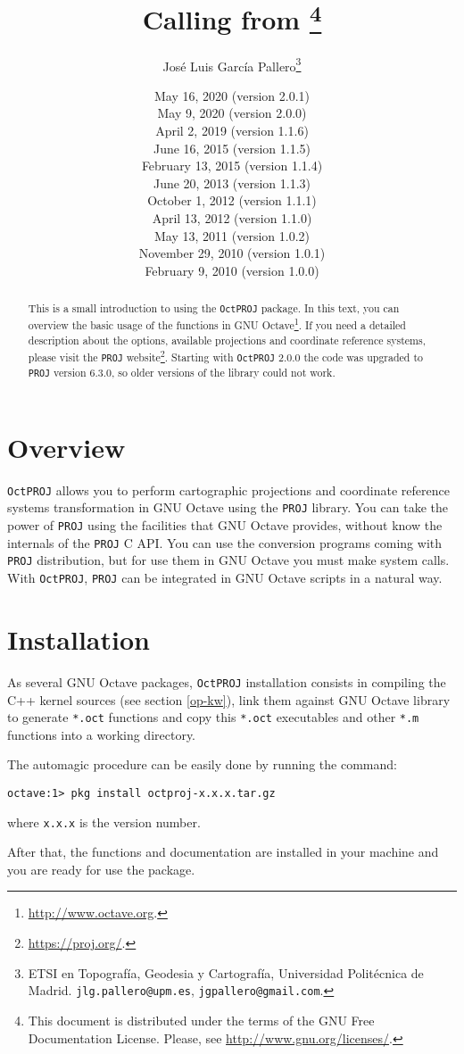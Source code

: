 \documentclass[10pt,a4paper]{article}
\title{\octproj\\Calling \proj{} from \octave\footnote{This document is
       distributed under the terms of the GNU Free Documentation License.
       Please, see \url{http://www.gnu.org/licenses/}.}}
\author{Jos\'e Luis Garc\'ia Pallero\footnote{ETSI en Topograf\'ia, Geodesia y
        Cartograf\'ia, Universidad Polit\'ecnica de Madrid.
        \texttt{jlg.pallero@upm.es}, \texttt{jgpallero@gmail.com}.}}
\date{May 16, 2020 (version 2.0.1)\\
      May 9, 2020 (version 2.0.0)\\
      April 2, 2019 (version 1.1.6)\\
      June 16, 2015 (version 1.1.5)\\
      February 13, 2015 (version 1.1.4)\\
      June 20, 2013 (version 1.1.3)\\
      October 1, 2012 (version 1.1.1)\\
      April 13, 2012 (version 1.1.0)\\
      May 13, 2011 (version 1.0.2)\\
      November 29, 2010 (version 1.0.1)\\
      February 9, 2010 (version 1.0.0)}
\newcommand{\octproj}{\texttt{OctPROJ}}
\newcommand{\proj}{\texttt{PROJ}}
\newcommand{\octave}{GNU Octave}
\begin{document}
\maketitle

\begin{abstract}
This is a small introduction to using the \octproj{} package. In this text, you
can overview the basic usage of the functions in
\octave\footnote{\url{http://www.octave.org}.}. If you need a detailed
description about the options, available projections and coordinate reference
systems, please visit the \proj{} website\footnote{\url{https://proj.org/}.}.
Starting with \octproj{} 2.0.0 the code was upgraded to \proj{} version 6.3.0,
so older versions of the library could not work.
\end{abstract}

\tableofcontents

\section{Overview}

\octproj{} allows you to perform cartographic projections and coordinate
reference systems transformation in \octave{} using the \proj{} library. You can
take the power of \proj{} using the facilities that \octave{} provides, without
know the internals of the \proj{} C API. You can use the conversion programs
coming with \proj{} distribution, but for use them in \octave{} you must make
system calls. With \octproj{}, \proj{} can be integrated in \octave{} scripts in
a natural way.

\section{Installation}

As several \octave{} packages, \octproj{} installation consists in compiling the
C++ kernel sources (see section \ref{op-kw}), link them against \octave{}
library to generate \texttt{*.oct} functions and copy this \texttt{*.oct}
executables and other \texttt{*.m} functions into a working directory.

The automagic procedure can be easily done by running the command:

\begin{verbatim}
octave:1> pkg install octproj-x.x.x.tar.gz
\end{verbatim}
where \texttt{x.x.x} is the version number.

After that, the functions and documentation are installed in your machine and
you are ready for use the package.
\end{document}
